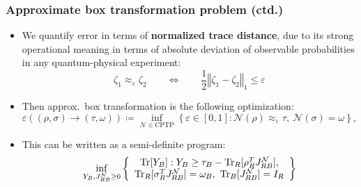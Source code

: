 \documentclass[usenames,dvipsnames,handout]{beamer}
\begin{document}
\begin{frame}
\frametitle{Approximate box transformation problem (ctd.)}

\begin{itemize}

\pause
\item We quantify error in terms of {\color{MidnightBlue}\textbf{normalized trace distance}}, due to its strong operational meaning in terms of absolute deviation of observable probabilities in any quantum-physical experiment:
$$
\zeta_1 \approx_{\varepsilon} \zeta_2 \qquad \Longleftrightarrow \qquad \frac{1}{2} \left \Vert \zeta_1 - \zeta_2 \right \Vert_1 \leq \varepsilon
$$

\pause
\vspace{.1in}
\item Then approx.~box transformation is the following optimization:
$$
\varepsilon((\rho,\sigma)\rightarrow(\tau,\omega
))\coloneqq \label{eq:approx-box-trans}
\inf_{\mathcal{N}\in\text{CPTP}}\left\{  \varepsilon\in\left[  0,1\right]
:\mathcal{N}(\rho)\approx_{\varepsilon}\tau,\ \mathcal{N}(\sigma
)=\omega\right\}  ,
$$

\pause
\vspace{.1in}
\item This can be written as a semi-definite program:
\begin{align*}
\inf_{Y_{B},J_{RB}^{\mathcal{N}} \geq 0}\left\{
\begin{array}
[c]{c}%
\operatorname{Tr}[Y_{B}]:
Y_{B}\geq\tau_{B}-\operatorname{Tr}_{R}[\rho_{R}^{T}J_{RB}^{\mathcal{N}}],\\
\operatorname{Tr}_{R}[\sigma_{R}^{T}J_{RB}^{\mathcal{N}}]=\omega_{B},\
\operatorname{Tr}_{B}[J_{RB}^{\mathcal{N}}]=I_{R}
\end{array}
\right\}
\end{align*}


\end{itemize}


\end{frame}
\end{document}
